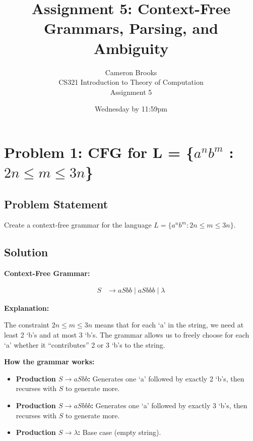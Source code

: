 \documentclass[12pt]{article}
\title{Assignment 5: Context-Free Grammars, Parsing, and Ambiguity}
\author{Cameron Brooks \\
        CS321 Introduction to Theory of Computation \\
        Assignment 5}
\date{Wednesday by 11:59pm}
\begin{document}
\maketitle
\thispagestyle{empty}

\newpage
\tableofcontents
\newpage


\section{Problem 1: CFG for L = \{$a^n b^m$ : $2n \leq m \leq 3n$\}}

\subsection{Problem Statement}
Create a context-free grammar for the language $L = \{a^n b^m : 2n \leq m \leq 3n\}$.

\subsection{Solution}

\textbf{Context-Free Grammar:}

\begin{align*}
S &\to aSbb \mid aSbbb \mid \lambda
\end{align*}

\textbf{Explanation:}

The constraint $2n \leq m \leq 3n$ means that for each `a' in the string, we need at least 2 `b's and at most 3 `b's. The grammar allows us to freely choose for each `a' whether it ``contributes'' 2 or 3 `b's to the string.

\textbf{How the grammar works:}

\begin{itemize}
\item \textbf{Production $S \to aSbb$:} Generates one `a' followed by exactly 2 `b's, then recurses with $S$ to generate more.

\item \textbf{Production $S \to aSbbb$:} Generates one `a' followed by exactly 3 `b's, then recurses with $S$ to generate more.

\item \textbf{Production $S \to \lambda$:} Base case (empty string).
\end{itemize}
\end{document}
